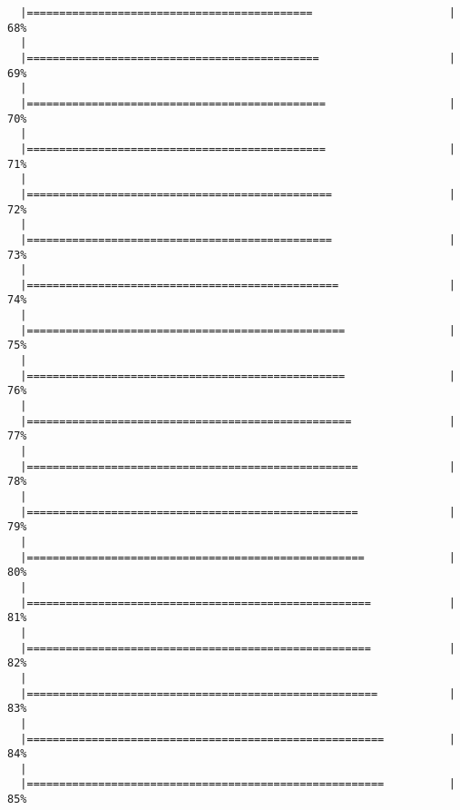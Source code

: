 \documentclass[]{article}
\begin{document}
\begin{verbatim}
  |============================================                     |  68%
  |                                                                       
  |=============================================                    |  69%
  |                                                                       
  |==============================================                   |  70%
  |                                                                       
  |==============================================                   |  71%
  |                                                                       
  |===============================================                  |  72%
  |                                                                       
  |===============================================                  |  73%
  |                                                                       
  |================================================                 |  74%
  |                                                                       
  |=================================================                |  75%
  |                                                                       
  |=================================================                |  76%
  |                                                                       
  |==================================================               |  77%
  |                                                                       
  |===================================================              |  78%
  |                                                                       
  |===================================================              |  79%
  |                                                                       
  |====================================================             |  80%
  |                                                                       
  |=====================================================            |  81%
  |                                                                       
  |=====================================================            |  82%
  |                                                                       
  |======================================================           |  83%
  |                                                                       
  |=======================================================          |  84%
  |                                                                       
  |=======================================================          |  85%

\end{verbatim}
\end{document}
